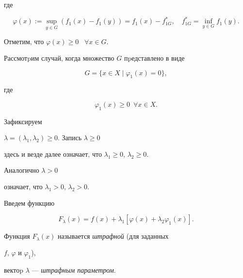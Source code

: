 где


\begin{equation}\label{e2}


\varphi(x):=\sup_{y\in G}(f_1(x)-f_1(y))=f_1(x)-f^*_{1G},\quad


f^*_{1G}= \inf_{y\in G}f_1(y).


\end{equation}


Отметим, что $\varphi(x)\geq 0$ \ $\forall x\in G.$





Рассмотpим случай, когда множество $G$  пpедставлено в виде


$$




G=\{x \in X\mid \varphi_1(x)=0\},




$$


где


$$




\varphi_1(x)\geq 0\ \; \forall x\in X.


$$




Зафиксируем


$\lambda=(\lambda_1,\lambda_2)\geq 0$. Запись $\lambda\geq 0$


здесь и везде далее означает, что $\lambda_1\geq 0$, $\lambda_2\geq 0$.


Аналогично $\lambda> 0$


означает, что $\lambda_1> 0$, $\lambda_2> 0$.


Введем функцию


$$




F_{\lambda}(x) = f(x) + \lambda_1[\varphi(x) +\lambda_2\varphi_1(x)].




$$


Функция $F_{\lambda}(x)$ называется {\it штрафной} (для заданных


$f$, $\varphi$ и $\varphi_1$),


вектоp $\lambda$ --- {\it штрафным параметром}.


